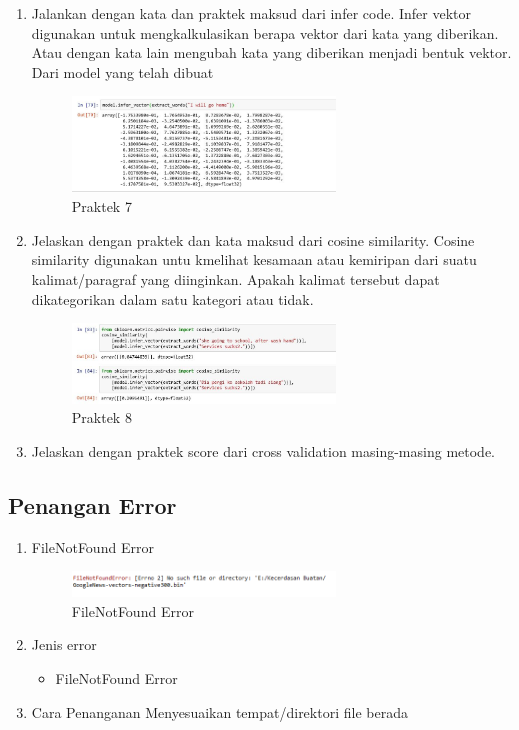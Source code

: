 \begin{enumerate}
	\item Jalankan dengan kata dan praktek maksud dari infer code.
	\hfill\break
	Infer vektor digunakan untuk mengkalkulasikan berapa vektor dari kata yang diberikan. Atau dengan kata lain mengubah kata yang diberikan menjadi bentuk vektor. Dari model yang telah dibuat 
		\begin{figure}[H]
			\includegraphics[width=7cm]{figures/1174087/5/26.png}
			\centering
			\caption{Praktek 7}
		\end{figure}

	\item Jelaskan dengan praktek dan kata maksud dari cosine similarity.
	Cosine similarity digunakan untu kmelihat kesamaan atau kemiripan dari suatu kalimat/paragraf yang diinginkan. Apakah kalimat tersebut dapat dikategorikan dalam satu kategori atau tidak.
	\hfill\break
	
		\begin{figure}[H]
			\includegraphics[width=7cm]{figures/1174087/5/27.png}
			\centering
			\caption{Praktek 8}
		\end{figure}
	\item Jelaskan dengan praktek score dari cross validation masing-masing metode.
		
\end{enumerate}
\subsection{Penangan Error}
\begin{enumerate}
	\item FileNotFound Error
	\hfill\break
		\begin{figure}[H]
			\includegraphics[width=7cm]{figures/1174087/5/error.png}
			\centering
			\caption{FileNotFound Error}
		\end{figure}
	\item Jenis error
	\begin{itemize}
		\item FileNotFound Error
	\end{itemize}
	\item Cara Penanganan
	\hfill\break
	Menyesuaikan tempat/direktori file berada
\end{enumerate}

